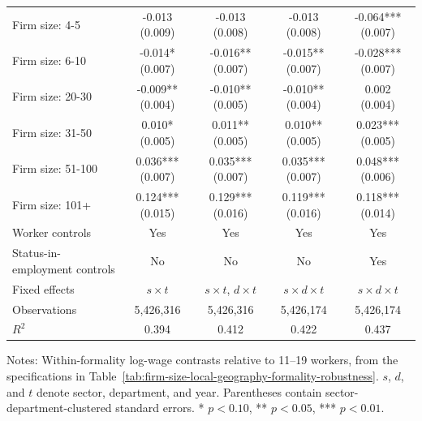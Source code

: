 \begin{table}[p]
\begin{tabular}{lcccc}
    Firm size: 4-5 & -0.013 {\scriptsize (0.009)} & -0.013 {\scriptsize (0.008)} & -0.013 {\scriptsize (0.008)} & -0.064*** {\scriptsize (0.007)} \\
    Firm size: 6-10 & -0.014* {\scriptsize (0.007)} & -0.016** {\scriptsize (0.007)} & -0.015** {\scriptsize (0.007)} & -0.028*** {\scriptsize (0.007)} \\
    Firm size: 20-30 & -0.009** {\scriptsize (0.004)} & -0.010** {\scriptsize (0.005)} & -0.010** {\scriptsize (0.004)} & 0.002 {\scriptsize (0.004)} \\
    Firm size: 31-50 & 0.010* {\scriptsize (0.005)} & 0.011** {\scriptsize (0.005)} & 0.010** {\scriptsize (0.005)} & 0.023*** {\scriptsize (0.005)} \\
    Firm size: 51-100 & 0.036*** {\scriptsize (0.007)} & 0.035*** {\scriptsize (0.007)} & 0.035*** {\scriptsize (0.007)} & 0.048*** {\scriptsize (0.006)} \\
    Firm size: 101+ & 0.124*** {\scriptsize (0.015)} & 0.129*** {\scriptsize (0.016)} & 0.119*** {\scriptsize (0.016)} & 0.118*** {\scriptsize (0.014)} \\
    \midrule
    Worker controls & Yes & Yes & Yes & Yes \\
    Status-in-employment controls & No & No & No & Yes \\
    Fixed effects & $s\times t$ & $s\times t$, $d\times t$ & $s\times d\times t$ & $s\times d\times t$ \\
    Observations & 5,426,316 & 5,426,316 & 5,426,174 & 5,426,174 \\
    $R^2$ & 0.394 & 0.412 & 0.422 & 0.437 \\
    \bottomrule
  \end{tabular}
  \vspace{0.3em}
  \begin{minipage}{0.95\textwidth}
  \footnotesize
  Notes: Within-formality log-wage contrasts relative to 11--19 workers, from the specifications in Table~\ref{tab:firm-size-local-geography-formality-robustness}. $s$, $d$, and $t$ denote sector, department, and year. Parentheses contain sector-department-clustered standard errors. * $p<0.10$, ** $p<0.05$, *** $p<0.01$.
  \end{minipage}
\end{table}

